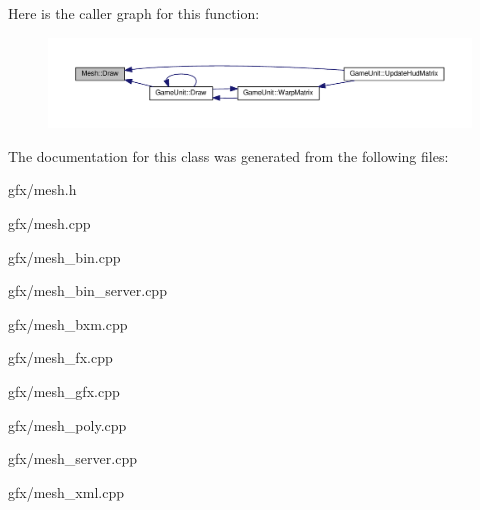 Here is the caller graph for this function\+:
\nopagebreak
\begin{figure}[H]
\begin{center}
\leavevmode
\includegraphics[width=350pt]{d9/d5e/classMesh_a951d49f48a9fa1a4ef287373eb5d0425_icgraph}
\end{center}
\end{figure}




The documentation for this class was generated from the following files\+:\begin{DoxyCompactItemize}
\item 
gfx/mesh.\+h\item 
gfx/mesh.\+cpp\item 
gfx/mesh\+\_\+bin.\+cpp\item 
gfx/mesh\+\_\+bin\+\_\+server.\+cpp\item 
gfx/mesh\+\_\+bxm.\+cpp\item 
gfx/mesh\+\_\+fx.\+cpp\item 
gfx/mesh\+\_\+gfx.\+cpp\item 
gfx/mesh\+\_\+poly.\+cpp\item 
gfx/mesh\+\_\+server.\+cpp\item 
gfx/mesh\+\_\+xml.\+cpp\end{DoxyCompactItemize}
